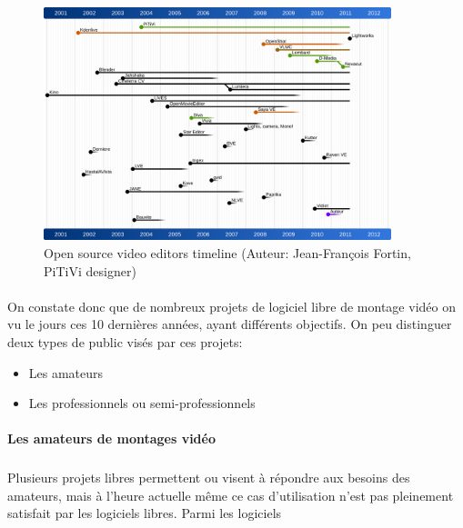 \begin{figure} [h]
  \begin{center}
    \includegraphics[width=0.9\textwidth]{images/open-source-video-editor-timeline}
  \end{center} \caption{Open source video editors timeline (Auteur:
  Jean-François Fortin, PiTiVi designer)} \label{Yes}
\end{figure}

\paragraph{ }

On constate donc que de nombreux projets de logiciel libre de montage
vidéo on vu le jours ces 10 dernières années, ayant différents
objectifs.  On peu distinguer deux types de public visés par ces
projets:

\begin {itemize}

  \item {Les amateurs}

  \item {Les professionnels ou semi-professionnels}
\end {itemize}

\paragraph {Les amateurs de montages vidéo}

\subparagraph{}

Plusieurs projets libres permettent ou visent à répondre aux besoins
des amateurs, mais à l'heure actuelle même ce cas d'utilisation n'est
pas pleinement satisfait par les logiciels libres. Parmi les logiciels

